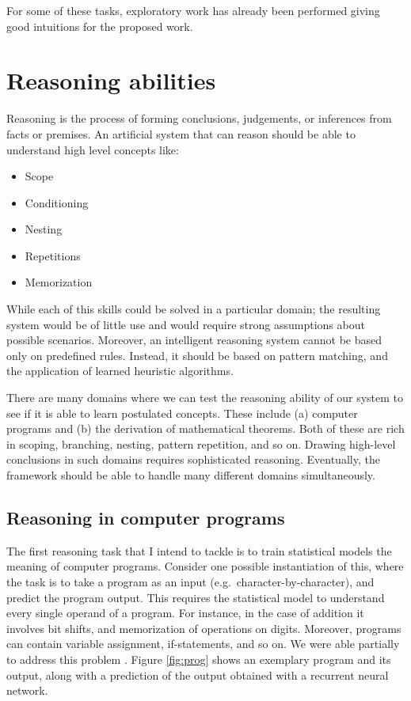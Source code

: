 \documentclass{article}
\begin{document}
For some of these tasks, exploratory work has already been performed 
giving good intuitions for the proposed work. 

\section{Reasoning abilities}

Reasoning is the process of forming conclusions, judgements, or
inferences from facts or premises. An artificial system that can
reason should be able to understand high level concepts like: 
\begin{itemize}
 \item Scope
 \item Conditioning
 \item Nesting
 \item Repetitions
 \item Memorization 
 \end{itemize}
While each of this skills could be solved in a particular domain; the
resulting system would be of little use and would require
strong assumptions about possible scenarios. Moreover, an intelligent
reasoning system cannot be based only on predefined rules. Instead, it
should be based on pattern matching, and the application of learned heuristic algorithms. 

There are many domains where we can test the reasoning ability of our
system to see if it is able to learn postulated concepts. These
include (a) computer programs and (b) the derivation of mathematical
theorems. Both of these are rich in scoping, branching, nesting,
pattern repetition, and so on. Drawing high-level conclusions in such
domains requires sophisticated reasoning. Eventually, the framework
should be able to handle many different domains simultaneously.

\subsection{Reasoning in computer programs}
The first reasoning task that I intend to tackle is to train
statistical models the meaning of computer programs.
Consider one possible instantiation of this, where the task is to take
a program as an input (e.g.~character-by-character), and predict the
program output. This requires the statistical model to understand
every single operand of a program. For instance, in the case of
addition it involves bit shifts, and memorization of operations on
digits. Moreover, programs can contain variable assignment, if-statements, and so on.
We were able partially to address this problem \cite{zaremba2014execute}.
Figure \ref{fig:prog} shows an exemplary program and its output, along
with a prediction of the output obtained with a recurrent neural network.
\end{document}
